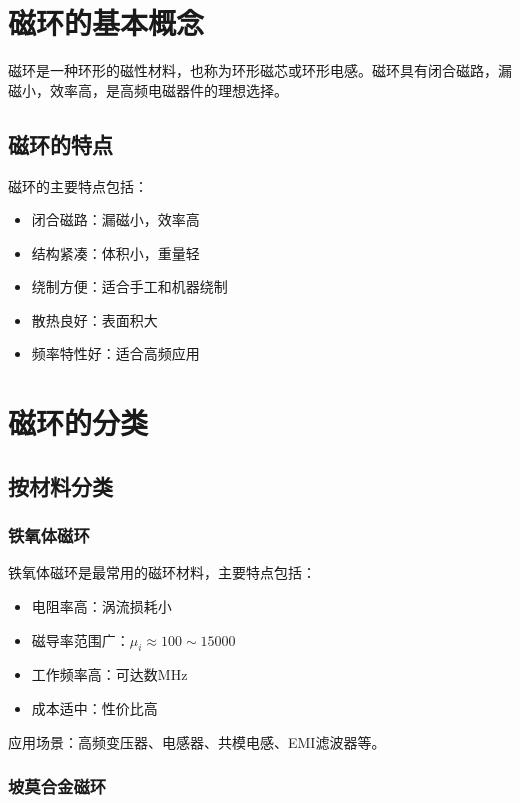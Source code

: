 \documentclass[12pt,UTF8]{ctexbook}
\begin{document}
\section{磁环的基本概念}

磁环是一种环形的磁性材料，也称为环形磁芯或环形电感。磁环具有闭合磁路，漏磁小，效率高，是高频电磁器件的理想选择。

\subsection{磁环的特点}

磁环的主要特点包括：

\begin{itemize}[leftmargin=2cm]
    \item 闭合磁路：漏磁小，效率高
    \item 结构紧凑：体积小，重量轻
    \item 绕制方便：适合手工和机器绕制
    \item 散热良好：表面积大
    \item 频率特性好：适合高频应用
\end{itemize}

\section{磁环的分类}

\subsection{按材料分类}

\subsubsection{铁氧体磁环}

铁氧体磁环是最常用的磁环材料，主要特点包括：

\begin{itemize}[leftmargin=2cm]
    \item 电阻率高：涡流损耗小
    \item 磁导率范围广：$\mu_i \approx 100 \sim 15000$
    \item 工作频率高：可达数MHz
    \item 成本适中：性价比高
\end{itemize}

应用场景：高频变压器、电感器、共模电感、EMI滤波器等。

\subsubsection{坡莫合金磁环}
\end{document}
